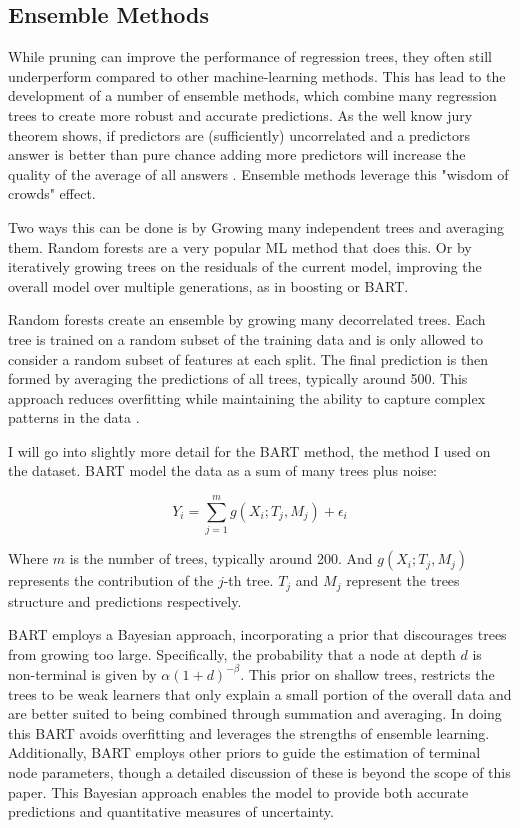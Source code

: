 \documentclass[12pt]{article}
\begin{document}
\subsection{Ensemble Methods}
While pruning can improve the performance of regression trees, they often still underperform compared to other machine-learning methods. This has lead to the development of a number of ensemble methods, which combine many regression trees to create more robust and accurate predictions. As the well know jury theorem shows, if predictors are (sufficiently) uncorrelated and a predictors answer is better than pure chance adding more predictors will increase the quality of the average of all answers \citep{condorcet1785}. Ensemble methods leverage this "wisdom of crowds" effect.

Two ways this can be done is by Growing many independent trees and averaging them. Random forests are a very popular ML method that does this. Or by iteratively growing trees on the residuals of the current model, improving the overall model over multiple generations, as in boosting or BART.

Random forests create an ensemble by growing many decorrelated trees. Each tree is trained on a random subset of the training data and is only allowed to consider a random subset of features at each split. The final prediction is then formed by averaging the predictions of all trees, typically around 500. This approach reduces overfitting while maintaining the ability to capture complex patterns in the data \citep{biau2016}.

I will go into slightly more detail for the BART method, the method I used on the dataset. BART model the data as a sum of many trees plus noise:

\begin{equation}
    Y_i = \sum_{j=1}^{m} g(X_i; T_j, M_j) + \epsilon_i
\end{equation}

Where $m$ is the number of trees, typically around 200. And $g(X_i; T_j, M_j)$ represents the contribution of the $j$-th tree. $T_j$ and $M_j$ represent the trees structure and predictions respectively.

BART employs a Bayesian approach, incorporating a prior that discourages trees from growing too large. Specifically, the probability that a node at depth $d$ is non-terminal is given by $\alpha(1 + d)^{-\beta}$. This prior on shallow trees, restricts the trees to be weak learners that only explain a small portion of the overall data and are better suited to being combined through summation and averaging. In doing this BART avoids overfitting and leverages the strengths of ensemble learning. Additionally, BART employs other priors to guide the estimation of terminal node parameters, though a detailed discussion of these is beyond the scope of this paper. This Bayesian approach enables the model to provide both accurate predictions and quantitative measures of uncertainty.
\end{document}

